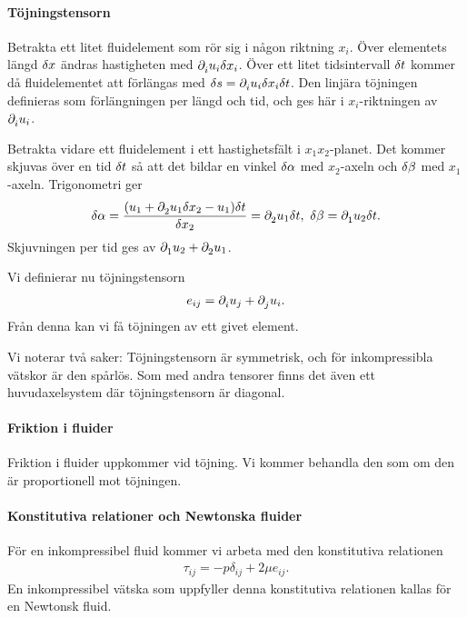 \paragraph{Töjningstensorn}
Betrakta ett litet fluidelement som rör sig i någon riktning $x_{i}$. Över elementets längd $\delta x$ ändras hastigheten med $\partial_{i}^{}u_{i}\delta x_{i}$. Över ett litet tidsintervall $\delta t$ kommer då fluidelementet att förlängas med $\delta s = \partial_{i}^{}u_{i}\delta x_{i}\delta t$. Den linjära töjningen definieras som förlängningen per längd och tid, och ges här i $x_{i}$-riktningen av $\partial_{i}^{}u_{i}$.

Betrakta vidare ett fluidelement i ett hastighetsfält i $x_{1}x_{2}$-planet. Det kommer skjuvas över en tid $\delta t$ så att det bildar en vinkel $\delta \alpha$ med $x_{2}$-axeln och $\delta \beta$ med $x_{1}$-axeln. Trigonometri ger
\begin{align*}
	\delta \alpha = \frac{(u_{1} + \partial_{2}^{}u_{1}\delta x_{2} - u_{1})\delta t}{\delta x_{2}} = \partial_{2}^{}u_{1}\delta t,\ \delta \beta = \partial_{1}^{}u_{2}\delta t.
\end{align*}
Skjuvningen per tid ges av $\partial_{1}^{}u_{2} + \partial_{2}^{}u_{1}$.

Vi definierar nu töjningstensorn
\begin{align*}
	e_{ij} = \partial_{i}^{}u_{j} + \partial_{j}^{}u_{i}.
\end{align*}
Från denna kan vi få töjningen av ett givet element.

Vi noterar två saker: Töjningstensorn är symmetrisk, och för inkompressibla vätskor är den spårlös. Som med andra tensorer finns det även ett huvudaxelsystem där töjningstensorn är diagonal.

\paragraph{Friktion i fluider}
Friktion i fluider uppkommer vid töjning. Vi kommer behandla den som om den är proportionell mot töjningen.

\paragraph{Konstitutiva relationer och Newtonska fluider}
För en inkompressibel fluid kommer vi arbeta med den konstitutiva relationen
\begin{align*}
	\tau_{ij} = -p\delta_{ij} + 2\mu e_{ij}.
\end{align*}
En inkompressibel vätska som uppfyller denna konstitutiva relationen kallas för en Newtonsk fluid.

